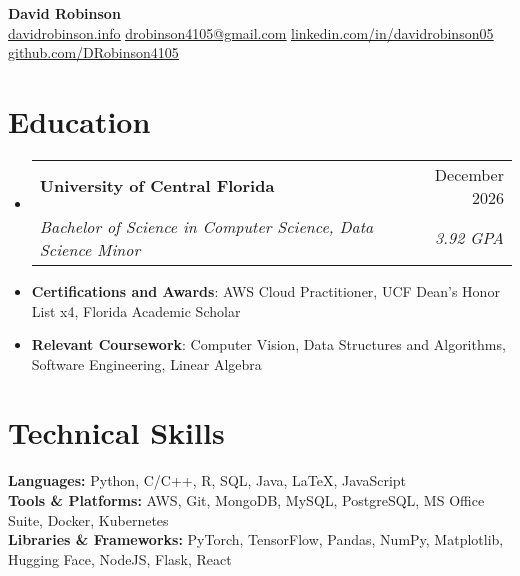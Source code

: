\documentclass[letterpaper,11pt]{article}
\makeatletter
\newcommand{\educationItem}[1]{
  \item\small{
    {#1 \vspace{-5pt}}
  }
}
\newcommand{\resumeSubheading}[4]{
  \vspace{-2pt}\item
    \begin{tabular*}{0.97\textwidth}[t]{l@{\extracolsep{\fill}}r}
      \textbf{#1} & #2 \\
      \textit{\small#3} & \textit{\small #4} \\
    \end{tabular*}\vspace{-7pt}
}
\newcommand{\resumeSubHeadingListStart}{\begin{itemize}[leftmargin=0.15in, label={}]}
\newcommand{\resumeSubHeadingListEnd}{\end{itemize}}
\makeatother
\begin{document}
\begin{center}
  \textbf{\Huge David Robinson} \\ \vspace{2pt} \small
  \faCode\hspace{0.25pt} \href{https://www.davidrobinson.info/}{\uline{davidrobinson.info}}
  \faEnvelope\hspace{0.25pt} \href{mailto:drobinson4105@gmail.com}{\uline{drobinson4105@gmail.com}}
  \faLinkedin\hspace{0.25pt} \href{https://linkedin.com/in/davidrobinson05}{\uline{linkedin.com/in/davidrobinson05}}
  \faGithub\hspace{0.25pt} \href{https://github.com/DRobinson4105}{\uline{github.com/DRobinson4105}}
\end{center}

\section{Education}
  \resumeSubHeadingListStart
    \resumeSubheading
      {University of Central Florida}{December 2026}
      {Bachelor of Science in Computer Science, Data Science Minor}{3.92 GPA}
    \educationItem{\textbf{Certifications and Awards}: AWS Cloud Practitioner, UCF Dean's Honor List x4, Florida Academic Scholar}
    \educationItem{\textbf{Relevant Coursework}: Computer Vision, Data Structures and Algorithms, Software Engineering, Linear Algebra}
  \resumeSubHeadingListEnd

\section{Technical Skills}
  \begin{itemize}[leftmargin=0.15in, label={}]
    \small{\item{
      \textbf{Languages:}{ Python, C/C++, R, SQL, Java, LaTeX, JavaScript} \\
      \textbf{Tools \& Platforms:}{ AWS, Git, MongoDB, MySQL, PostgreSQL, MS Office Suite, Docker, Kubernetes} \\
      \textbf{Libraries \& Frameworks:}{ PyTorch, TensorFlow, Pandas, NumPy, Matplotlib, Hugging Face, NodeJS, Flask, React}
    }}
  \end{itemize}
\end{document}
